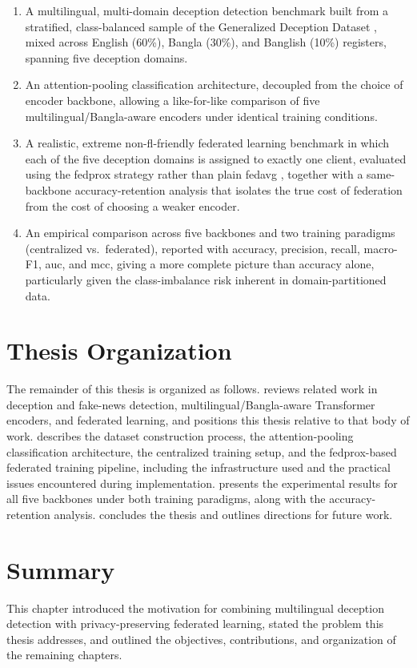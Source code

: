 \begin{enumerate}
    \item A multilingual, multi-domain deception detection benchmark built from a stratified, class-balanced sample of the Generalized Deception Dataset \cite{zeng2022generalized}, mixed across English (60\%), Bangla (30\%), and Banglish (10\%) registers, spanning five deception domains.
    \item An attention-pooling classification architecture, decoupled from the choice of encoder backbone, allowing a like-for-like comparison of five multilingual/Bangla-aware encoders under identical training conditions.
    \item A realistic, extreme non-\gls{fl}-friendly federated learning benchmark in which each of the five deception domains is assigned to exactly one client, evaluated using the \gls{fedprox} strategy \cite{li2020federated} rather than plain \gls{fedavg} \cite{mcmahan2017communication}, together with a same-backbone accuracy-retention analysis that isolates the true cost of federation from the cost of choosing a weaker encoder.
    \item An empirical comparison across five backbones and two training paradigms (centralized vs.\ federated), reported with accuracy, precision, recall, macro-F1, \gls{auc}, and \gls{mcc}, giving a more complete picture than accuracy alone, particularly given the class-imbalance risk inherent in domain-partitioned data.
\end{enumerate}

\section{Thesis Organization}

The remainder of this thesis is organized as follows.  reviews related work in deception and fake-news detection, multilingual/Bangla-aware Transformer encoders, and federated learning, and positions this thesis relative to that body of work.  describes the dataset construction process, the attention-pooling classification architecture, the centralized training setup, and the \gls{fedprox}-based federated training pipeline, including the infrastructure used and the practical issues encountered during implementation.  presents the experimental results for all five backbones under both training paradigms, along with the accuracy-retention analysis.  concludes the thesis and outlines directions for future work.

\section{Summary}

This chapter introduced the motivation for combining multilingual deception detection with privacy-preserving federated learning, stated the problem this thesis addresses, and outlined the objectives, contributions, and organization of the remaining chapters.
